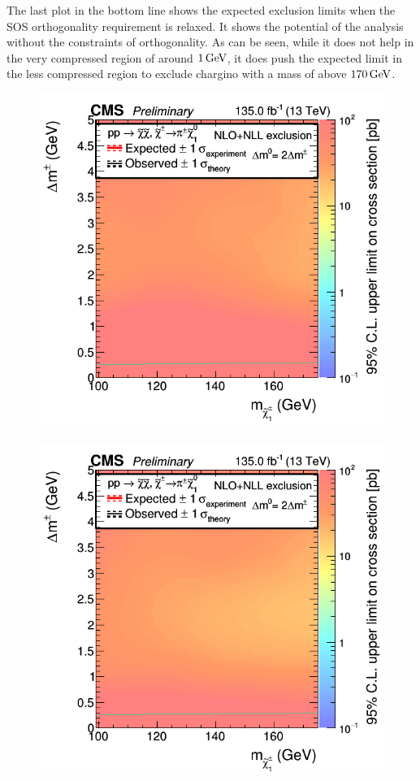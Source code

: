 The last plot in the bottom line shows the expected exclusion limits when the SOS orthogonality requirement is relaxed. It shows the potential of the analysis without the constraints of orthogonality. As can be seen, while it does not help in the very compressed region of around $1\,\text{Ge\hspace{-.08em}V}$, it does push the expected limit in the less compressed region to exclude chargino with a mass of above $170\,\text{Ge\hspace{-.08em}V}$.

\begin{figure}[!htb]
\centering
\includegraphics[width=0.48\linewidth]{plots/limits/expected/PureHiggsino_1tElectrons_ExpectedXSEC.png} \,
\includegraphics[width=0.48\linewidth]{plots/limits/expected/PureHiggsino_1tMuons_comb_ExpectedXSEC.png} \\


\end{figure}
